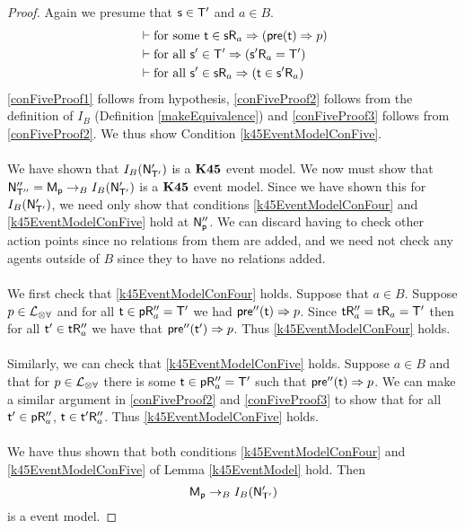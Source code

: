 \begin{proof}
	Again we presume that $\mathrm{\mathsf{s}} \in \mathrm{\mathsf{T}}'$ and $a \in B$.
	\begin{align}
		& \vdash \text{for some } \mathrm{\mathsf{t}} \in \mathrm{\mathsf{s}} \mathrm{\mathsf{R}}_a \Rightarrow (\mathrm{\mathsf{pre}}(\mathrm{\mathsf{t}}) \Rightarrow p)
		\label{conFiveProof1} \\
		& \vdash \text{for all } \mathrm{\mathsf{s}}' \in \mathrm{\mathsf{T}}' \Rightarrow (\mathrm{\mathsf{s}}' \mathrm{\mathsf{R}}_a = \mathrm{\mathsf{T}}') \label{conFiveProof2}
		\\
		& \vdash \text{for all } \mathrm{\mathsf{s}}' \in \mathrm{\mathsf{s}} \mathrm{\mathsf{R}}_a \Rightarrow (\mathrm{\mathsf{t}} \in \mathrm{\mathsf{s}}' \mathrm{\mathsf{R}}_a)
		\label{conFiveProof3}
	\end{align}
	\ref{conFiveProof1} follows from hypothesis, \ref{conFiveProof2} follows from the definition of
	$I_B$ (Definition \ref{makeEquivalence}) and \ref{conFiveProof3} follows from \ref{conFiveProof2}.
	We thus show Condition \ref{k45EventModelConFive}.\\
	\\
	We have shown that $I_B(\mathrm{\mathsf{N}}'_{\mathrm{\mathsf{T}}'})$ is a $\bf K45$ event model.
	We now must show that $\mathrm{\mathsf{N}}''_{\mathrm{\mathsf{T}}''} = \mathrm{\mathsf{M_p}} \to_B I_B(\mathrm{\mathsf{N}}'_{\mathrm{\mathsf{T}}'})$ is a $\bf K45$ event
	model.
	Since we have shown this for $I_B(\mathrm{\mathsf{N}}'_{\mathrm{\mathsf{T}}'})$, we need only show that conditions
	\ref{k45EventModelConFour} and \ref{k45EventModelConFive} hold at $\mathrm{\mathsf{N}}''_\mathrm{\mathsf{p}}$.
	We can discard having to check other action points since no relations from them are added, and we
	need not check any agents outside of $B$ since they to have no relations added.\\
	\\
	We first check that \ref{k45EventModelConFour} holds.
	Suppose that $a \in B$.
	Suppose $p \in \mathcal{L}_{\otimes\forall}$ and for all $\mathrm{\mathsf{t}} \in \mathrm{\mathsf{p}} \mathrm{\mathsf{R}}''_a = \mathrm{\mathsf{T}}'$ we had
	$\mathrm{\mathsf{pre}}''(\mathrm{\mathsf{t}}) \Rightarrow	p$.
	Since $\mathrm{\mathsf{t}} \mathrm{\mathsf{R}}''_a = \mathrm{\mathsf{t}} \mathrm{\mathsf{R}}_a = \mathrm{\mathsf{T}}'$ then for all $\mathrm{\mathsf{t}}'	\in \mathrm{\mathsf{t}} \mathrm{\mathsf{R}}''_a$ we have that
	$\mathrm{\mathsf{pre}}''(\mathrm{\mathsf{t}}') \Rightarrow p$.
	Thus \ref{k45EventModelConFour} holds.\\
	\\
	Similarly, we can check that \ref{k45EventModelConFive} holds.
	Suppose $a \in B$ and that for $p \in \mathcal{L}_{\otimes\forall}$ there is some $\mathrm{\mathsf{t}} \in \mathrm{\mathsf{p}} \mathrm{\mathsf{R}}''_a = \mathrm{\mathsf{T}}'$
	such that $\mathrm{\mathsf{pre}}''(\mathrm{\mathsf{t}}) \Rightarrow p$.
	We can make a similar argument in \ref{conFiveProof2} and \ref{conFiveProof3} to show that for all
	$\mathrm{\mathsf{t}}' \in \mathrm{\mathsf{p}} \mathrm{\mathsf{R}}''_a$, $\mathrm{\mathsf{t}} \in \mathrm{\mathsf{t}}' \mathrm{\mathsf{R}}''_a$.
	Thus \ref{k45EventModelConFive} holds.\\
	\\
	We have thus shown that both conditions \ref{k45EventModelConFour} and \ref{k45EventModelConFive}
	of Lemma \ref{k45EventModel} hold.
	Then
	\[
		\mathrm{\mathsf{M}}_\mathrm{\mathsf{p}} \to_B I_B(\mathrm{\mathsf{N}}'_{\mathrm{\mathsf{T}}'})
	\]
	is a \AXKFF event model.
\end{proof}

